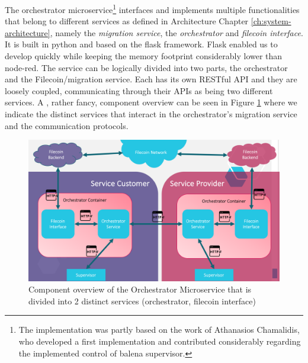 The orchestrator microservice\footnote{The implementation was partly based on the work of Athanasios Chamalidis, who developed a first implementation and contributed considerably regarding the implemented control of balena supervisor\cite{sakis}.} interfaces and implements multiple functionalities that belong to different services as defined in Architecture Chapter \ref{ch:system-architecture}, namely the \textit{migration service}, the \textit{orchestrator} and \textit{filecoin interface}. It is built in python and based on the flask framework. Flask enabled us to develop quickly while keeping the memory footprint considerably lower than node-red. The service can be logically divided into two parts, the orchestrator and the Filecoin/migration service. Each has its own RESTful API and they are loosely coupled, communicating through their APIs as being two different services. A , rather fancy, component overview can be seen in Figure \ref{fig:orchestrator_component} where we indicate the distinct services that interact in the orchestrator's migration service and the communication protocols.

\begin{figure}[h]
    \centering
    \includegraphics[width=1\textwidth]{images/orchestrator_comp.png}
    \caption{Component overview of the Orchestrator Microservice that is divided into 2 distinct services (orchestrator, filecoin interface)}
    \label{fig:orchestrator_component}
\end{figure}


